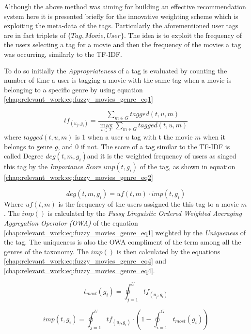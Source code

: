 Although the above method was aiming for building an effective recommendation system here it is presented briefly for the innovative weighting scheme which is exploiting the meta-data of the tags. Particularly the aforementioned user tags are in fact triplets of  $\{Tag, Movie, User \}$. The idea is to exploit the frequency of the users selecting a tag for a movie and then the frequency of the movies a tag was occurring, similarly to the TF-IDF.

To do so initially the \textit{Appropriateness} of a tag is evaluated by counting the number of time a user is tagging a movie with the same tag when a movie is belonging to a specific genre by using equation \ref{chap:relevant_work:eq:fuzzy_movies_genre_eq1}

\begin{equation}\label{chap:relevant_work:eq:fuzzy_movies_genre_eq1}
	tf_(u_{j},g_{i}) = \frac{\sum_{m \in G} tagged(t,u,m) }{ \max_{t \in T} \sum_{m \in G} tagged(t,u,m)}
\end{equation}
where $tagged(t,u,m)$ is 1 when a user $u$ tag with t the movie $m$ when it belongs to genre $g$, and $0$ if not. The score of a tag similar to the TF-IDF is called Degree $deg(t,m,g_{i})$and it is the weighted frequency of users as singed this tag by the \textit{Importance Score} $imp(t,g_{i})$ of the tag, as shown in equation \ref{chap:relevant_work:eq:fuzzy_movies_genre_eq2}

\begin{equation}\label{chap:relevant_work:eq:fuzzy_movies_genre_eq2}
	deg(t,m,g_{i}) = uf(t,m) \cdot imp(t,g_{i})
\end{equation}
Where $uf(t,m)$ is the frequency of the users assigned the this tag to a movie $m$. The $imp()$ is calculated by the \textit{Fussy Linguistic Ordered Weighted Averaging Aggregation Operator (OWA)} of the equation \ref{chap:relevant_work:eq:fuzzy_movies_genre_eq1} weighted by the \textit{Uniqueness} of the tag. The uniqueness is also the OWA compliment of the term among all the genres of the taxonomy. The $imp()$ is then calculated by the equations \ref{chap:relevant_work:eq:fuzzy_movies_genre_eq4} and \ref{chap:relevant_work:eq:fuzzy_movies_genre_eq4}.

\begin{equation}\label{chap:relevant_work:eq:fuzzy_movies_genre_eq3}
	t_{most}(g_{i}) = \oint_{j=1}^{U} tf_(u_{j},g_{i})
\end{equation}

\begin{equation}\label{chap:relevant_work:eq:fuzzy_movies_genre_eq4}
	imp(t,g_{i}) = \oint_{j=1}^{U} tf_(u_{j},g_{i}) \cdot (1 -  \oint_{i=1}^{G} t_{most}(g_{i}))
\end{equation}

